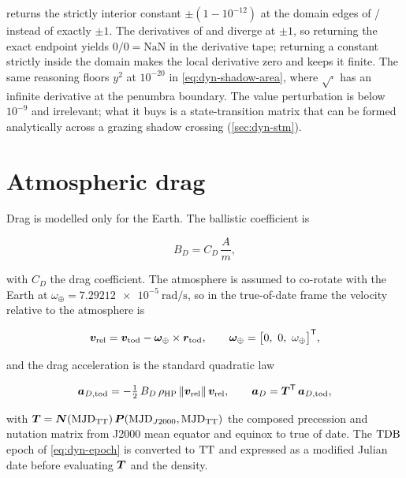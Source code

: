 \begin{lupntnote}
   returns the strictly interior constant $\pm(1-10^{-12})$ at the
  domain edges of / instead of exactly $\pm1$. The
  derivatives of  and  diverge at $\pm1$, so returning the
  exact endpoint yields $0/0=\mathrm{NaN}$ in the derivative tape; returning a
  constant strictly inside the domain makes the local derivative zero and keeps
  it finite. The same reasoning floors $y^2$ at $10^{-20}$ in
  \cref{eq:dyn-shadow-area}, where $\sqrt{\cdot}$ has an infinite derivative at
  the penumbra boundary. The value perturbation is below $10^{-9}$ and
  irrelevant; what it buys is a state-transition matrix that can be formed
  analytically across a grazing shadow crossing (\cref{sec:dyn-stm}).
\end{lupntnote}

\section{Atmospheric drag}
\label{sec:dyn-drag}

Drag is modelled only for the Earth. The ballistic coefficient is

\begin{equation}
  \label{eq:dyn-drag-bcoeff}
  B_D = C_D\,\frac{A}{m},
\end{equation}

with $C_D$ the drag coefficient. The atmosphere is assumed to co-rotate with the
Earth at $\omega_\oplus = \SI{7.29212e-5}{\radian\per\second}$, so in the
true-of-date frame the velocity relative to the atmosphere is

\begin{equation}
  \label{eq:dyn-drag-vrel}
  \vec{v}_\mathrm{rel} = \vec{v}_\mathrm{tod} - \vec{\omega}_\oplus\times\vec{r}_\mathrm{tod},
  \qquad
  \vec{\omega}_\oplus = \bigl[0,\ 0,\ \omega_\oplus\bigr]\transpose,
\end{equation}

and the drag acceleration is the standard quadratic law

\begin{equation}
  \label{eq:dyn-drag}
  \bm{a}_{D,\mathrm{tod}} = -\tfrac{1}{2}\,B_D\,\rho_\mathrm{HP}\,
  \lVert\bm{v}_\mathrm{rel}\rVert\,\bm{v}_\mathrm{rel},
  \qquad
  \bm{a}_D = \bm{T}^{\mathsf{T}}\,\bm{a}_{D,\mathrm{tod}},
\end{equation}

with $\bm{T} = \bm{N}(\mathrm{MJD}_{\mathrm{TT}})\,\bm{P}(\mathrm{MJD}_{J2000},
\mathrm{MJD}_{\mathrm{TT}})$ the composed precession and nutation matrix from J2000 mean
equator and equinox to true of date. The $\mathrm{TDB}$ epoch of \cref{eq:dyn-epoch} is
converted to $\mathrm{TT}$ and expressed as a modified Julian date before evaluating
$\bm{T}$ and the density.

